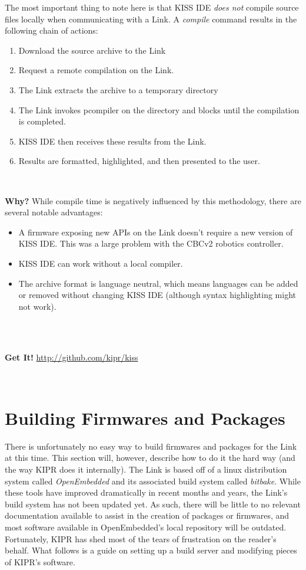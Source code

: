 \documentclass[12pt,letterpaper]{article}
\newcommand{\bcolorbox}[4]{\noindent \\ \fcolorbox{#1}{#2} {\parbox{\textwidth}{\vspace{.1em}\textbf{#3} #4\vspace{.1em}}} \\}
\newcommand{\why}[1]{\bcolorbox{black}{GhostWhite}{Why?}{#1}}
\newcommand{\getit}[1]{\bcolorbox{Indigo}{Lavender}{Get It!}{#1}}
\begin{document}
	
	The most important thing to note here is that KISS IDE \emph{does not} compile source files locally when communicating with a Link.
	A \emph{compile} command results in the following chain of actions:
	\begin{enumerate}
		\setlength{\itemsep}{0em}
		\item Download the source archive to the Link
		\item Request a remote compilation on the Link.
		\item The Link extracts the archive to a temporary directory
		\item The Link invokes pcompiler on the directory and blocks until
		the compilation is completed.
		\item KISS IDE then receives these results from the Link.
		\item Results are formatted, highlighted, and then presented to the user.
	\end{enumerate}
	
	\why{While compile time is negatively influenced by this methodology, there are several notable advantages:
	\begin{itemize}
		\setlength{\itemsep}{0em}
		\item A firmware exposing new APIs on the Link doesn't require a new version of KISS IDE. This was a large problem
		with the CBCv2 robotics controller.
		\item KISS IDE can work without a local compiler.
		\item The archive format is language neutral, which means languages can be added or removed without
		changing KISS IDE (although syntax highlighting might not work).
	\end{itemize}}
	
	\getit{\url{http://github.com/kipr/kiss}}
	\section{Building Firmwares and Packages}
	There is unfortunately no easy way to build firmwares and packages for the Link at this time. This section will, however, describe how
	to do it the hard way (and the way KIPR does it internally). The Link is based off of a linux distribution system called \emph{OpenEmbedded}
	and its associated build system called \emph{bitbake}. While these tools have improved dramatically in recent months and years, the Link's
	build system has not been updated yet. As such, there will be little to no relevant documentation available to assist in the creation
	of packages or firmwares, and most software available in OpenEmbedded's local repository will be outdated. Fortunately, KIPR has shed most of
	the tears of frustration on the reader's behalf. What follows is a guide on setting up a build server and modifying pieces of KIPR's software.
	
\end{document}
